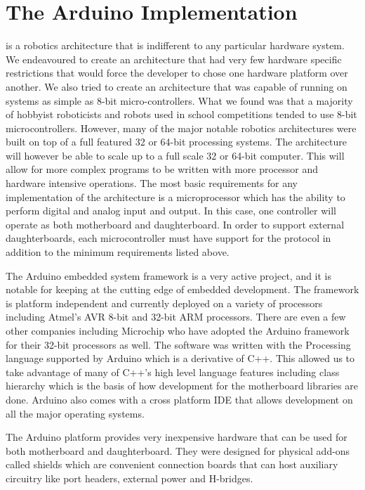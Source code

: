 

\section{The Arduino Implementation} %
\label{sec:the_arduino_implementation}
\xten is a robotics architecture that is indifferent to any particular hardware system. We endeavoured to create an architecture that had very few hardware specific restrictions that would force the developer to chose one hardware platform over another. We also tried to create an architecture that was capable of running on systems as simple as 8-bit micro-controllers. What we found was that a majority of hobbyist roboticists and robots used in school competitions tended to use 8-bit microcontrollers. However, many of the major notable robotics architectures were built on top of a full featured 32 or 64-bit processing systems. The architecture will however be able to scale up to a full scale 32 or 64-bit computer. This will allow for more complex programs to be written with more processor and hardware intensive operations. The most basic requirements for any implementation of the \xten architecture is a microprocessor which has the ability to perform digital and analog input and output. In this case, one controller will operate as both motherboard and daughterboard. In order to support external daughterboards, each microcontroller must have support for the \iic protocol in addition to the minimum requirements listed above.

The Arduino embedded system framework is a very active project, and it is notable for keeping at the cutting edge of embedded development. The framework is platform independent and currently deployed on a variety of processors including Atmel's AVR 8-bit and 32-bit ARM processors. There are even a few other companies including Microchip who have adopted the Arduino framework for their 32-bit processors as well. 
The \xten software was written with the Processing language supported by Arduino which is a derivative of C++. This allowed us to take advantage of many of C++'s high level language features including class hierarchy which is the basis of how development for the motherboard libraries are done. Arduino also comes with a cross platform IDE that allows development on all the major operating systems.

The Arduino platform provides very inexpensive hardware that can be used for both motherboard and daughterboard. They were designed for physical add-ons called shields which are convenient connection boards that can host auxiliary circuitry like port headers, external power and H-bridges.


